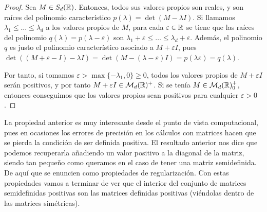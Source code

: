\begin{proof}
    Sea $M \in S_d(\mathbb{R})$. Entonces, todos sus valores propios son reales, y son raíces del polinomio característico $p(\lambda) = \det(M - \lambda I)$. Si llamamos $\lambda_1 \le \dots \le \lambda_d$ a los valores propios de $M$, para cada $\varepsilon \in \mathbb{R}$ se tiene que las raíces del polinomio $q(\lambda) = p(\lambda - \varepsilon)$ son $\lambda_1 + \varepsilon \le \dots \le \lambda_d + \varepsilon$. Además, el polinomio $q$ es justo el polinomio característico asociado a $M + \varepsilon I$, pues $\det( (M + \varepsilon - I) - \lambda I) = \det(M - (\lambda - \varepsilon)I ) = p(\lambda  \varepsilon) = q(\lambda)$.

    Por tanto, si tomamos $\varepsilon > \max\{-\lambda_1, 0\} \ge 0$, todos los valores propios de $M + \varepsilon I$ serán positivos, y por tanto $M + \varepsilon I \in \mathcal{M}_d(\mathbb{R})^+$. Si se tenía $M \in \mathcal{M}_d(\mathbb{R})^+_0$, entonces conseguimos que los valores propios sean positivos para cualquier $\varepsilon > 0$.
\end{proof}

La propiedad anterior es muy interesante desde el punto de vista computacional, pues en ocasiones los errores de precisión en los cálculos con matrices hacen que se pierda la condición de ser definida positiva. El resultado anterior nos dice que podemos recuperarla añadiendo un valor positivo a la diagonal de la matriz, siendo tan pequeño como queramos en el caso de tener una matriz semidefinida. De aquí que se enuncien como propiedades de regularización. Con estas propiedades vamos a terminar de ver que el interior del conjunto de matrices semidefinidas positivas son las matrices definidas positivas (viéndolas dentro de las matrices simétricas).

